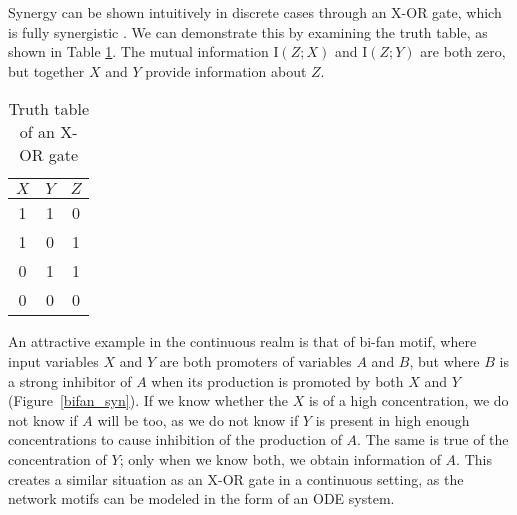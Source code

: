 \documentclass[../main.tex]{subfiles}
\begin{document}
Synergy can be shown intuitively in discrete cases through an X-OR gate, which is fully synergistic \cite{quax2017quantifying}.
We can demonstrate this by examining the truth table, as shown in Table \ref{XOR}.
The mutual information $\mathrm{I}\left( Z;X \right)$ and $\mathrm{I} \left( Z;Y \right)$ are both zero, but together $X$ and $Y$ provide information about $Z$.

\begin{table}[ht]
\begin{center}
\begin{tabular}{|c|c||c|}
\hline
$X$ & $Y$ & $Z$ \\
\hline
\hline
1 & 1 & 0 \\
1 & 0 & 1 \\
0 & 1 & 1 \\
0 & 0 & 0 \\
\hline
\end{tabular}
\end{center}
\caption{Truth table of an X-OR gate}
\label{XOR}
\end{table}

An attractive example in the continuous realm is that of bi-fan motif, where input variables $X$ and $Y$ are both promoters of variables $A$ and $B$, but where $B$ is a strong inhibitor of $A$ when its production is promoted by both $X$ and $Y$ (Figure~\ref{bifan_syn}).
If we know whether the $X$ is of a high concentration, we do not know if $A$ will be too, as we do not know if $Y$ is present in high enough concentrations to cause inhibition of the production of $A$.
The same is true of the concentration of $Y$; only when we know both, we obtain information of $A$.
This creates a similar situation as an X-OR gate in a continuous setting, as the network motifs can be modeled in the form of an ODE system.
\end{document}
